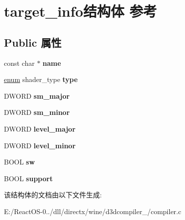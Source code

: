 \hypertarget{structtarget__info}{}\section{target\+\_\+info结构体 参考}
\label{structtarget__info}
\subsection*{Public 属性}
\begin{DoxyCompactItemize}
\item 
\mbox{\label{structtarget__info_a8b3417924e8cc030b467188e4974cd71}} 
const char $\ast$ {\bfseries name}
\item 
\mbox{\label{structtarget__info_a528208f2f1e26bbb47aee754ed9c360c}} 
\hyperlink{interfaceenum}{enum} shader\+\_\+type {\bfseries type}
\item 
\mbox{\label{structtarget__info_a05fb5958219aef2a082128ac12e9d473}} 
D\+W\+O\+RD {\bfseries sm\+\_\+major}
\item 
\mbox{\label{structtarget__info_a70084cb00efcfadce5b0a955f361ab3e}} 
D\+W\+O\+RD {\bfseries sm\+\_\+minor}
\item 
\mbox{\label{structtarget__info_ae3edbbfdb82551fd7a8d64a42b576c9b}} 
D\+W\+O\+RD {\bfseries level\+\_\+major}
\item 
\mbox{\label{structtarget__info_a72820113c0d3e29d86c30d3a91fb04a9}} 
D\+W\+O\+RD {\bfseries level\+\_\+minor}
\item 
\mbox{\label{structtarget__info_a8e438e568b0d73458f027d34887b50ca}} 
B\+O\+OL {\bfseries sw}
\item 
\mbox{\label{structtarget__info_a5e68690e0322595496165547bd7781b5}} 
B\+O\+OL {\bfseries support}
\end{DoxyCompactItemize}


该结构体的文档由以下文件生成\+:\begin{DoxyCompactItemize}
\item 
E\+:/\+React\+O\+S-\/0../dll/directx/wine/d3dcompiler\+\_/compiler.\+c\end{DoxyCompactItemize}
